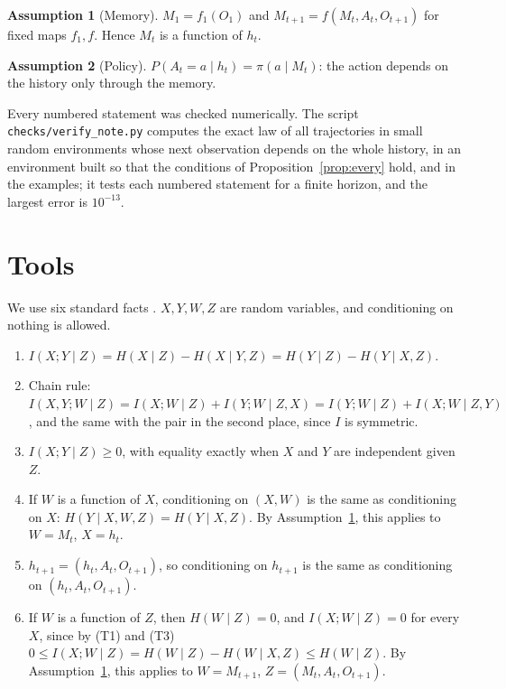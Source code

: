 \documentclass{article}
\theoremstyle{definition}
\newtheorem{assumption}{Assumption}
\theoremstyle{remark}
\begin{document}
\begin{assumption}[Memory]\label{as:mem}
$M_1=f_1(O_1)$ and $M_{t+1}=f(M_t,A_t,O_{t+1})$ for fixed maps $f_1,f$. Hence $M_t$ is a function of $h_t$.
\end{assumption}

\begin{assumption}[Policy]\label{as:pol}
$P(A_t=a\mid h_t)=\pi(a\mid M_t)$: the action depends on the history only through the memory.
\end{assumption}

Every numbered statement was checked numerically. The script \texttt{checks/verify\_note.py} computes the exact law of all trajectories in small random environments whose next observation depends on the whole history, in an environment built so that the conditions of Proposition~\ref{prop:every} hold, and in the examples; it tests each numbered statement for a finite horizon, and the largest error is $10^{-13}$.

\section{Tools}\label{sec:tools}

We use six standard facts \citep[Ch.~2]{cover2006elements}. $X,Y,W,Z$ are random variables, and conditioning on nothing is allowed.
\begin{enumerate}
\item[(T1)] $I(X;Y\mid Z)=H(X\mid Z)-H(X\mid Y,Z)=H(Y\mid Z)-H(Y\mid X,Z)$.
\item[(T2)] Chain rule: $I(X,Y;W\mid Z)=I(X;W\mid Z)+I(Y;W\mid Z,X)=I(Y;W\mid Z)+I(X;W\mid Z,Y)$, and the same with the pair in the second place, since $I$ is symmetric.
\item[(T3)] $I(X;Y\mid Z)\ge0$, with equality exactly when $X$ and $Y$ are independent given $Z$.
\item[(T4)] If $W$ is a function of $X$, conditioning on $(X,W)$ is the same as conditioning on $X$: $H(Y\mid X,W,Z)=H(Y\mid X,Z)$. By Assumption~\ref{as:mem}, this applies to $W=M_t$, $X=h_t$.
\item[(T5)] $h_{t+1}=(h_t,A_t,O_{t+1})$, so conditioning on $h_{t+1}$ is the same as conditioning on $(h_t,A_t,O_{t+1})$.
\item[(T6)] If $W$ is a function of $Z$, then $H(W\mid Z)=0$, and $I(X;W\mid Z)=0$ for every $X$, since by (T1) and (T3) $0\le I(X;W\mid Z)=H(W\mid Z)-H(W\mid X,Z)\le H(W\mid Z)$. By Assumption~\ref{as:mem}, this applies to $W=M_{t+1}$, $Z=(M_t,A_t,O_{t+1})$.
\end{enumerate}
\end{document}

